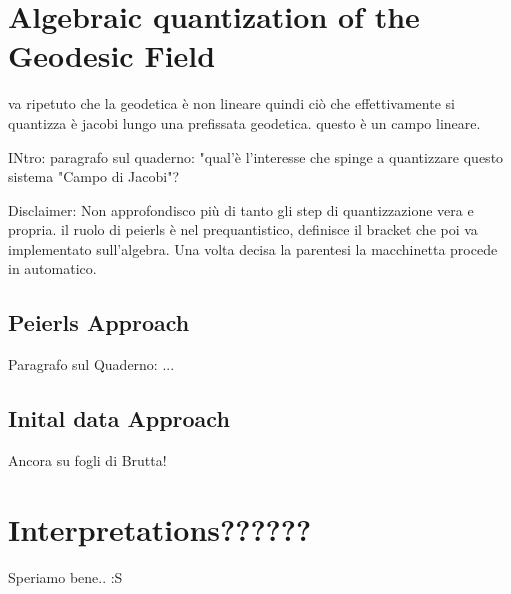 \documentclass[Main]{subfiles}
\begin{document}
\section{Algebraic quantization of the Geodesic Field}
	\begin{Warning}
	va ripetuto che la geodetica è non lineare quindi ciò che effettivamente si quantizza è jacobi lungo una prefissata geodetica. questo è un campo lineare.
	\end{Warning}
	
	\begin{Warning}
	INtro: paragrafo sul quaderno: "qual'è l'interesse che spinge a quantizzare questo sistema "Campo di Jacobi"?
	\end{Warning}

	\begin{Warning}
		Disclaimer: Non approfondisco più di tanto gli step di quantizzazione vera e propria. il ruolo di peierls è nel prequantistico, definisce il bracket che poi va implementato sull'algebra. Una volta decisa la parentesi la macchinetta procede in automatico.
	\end{Warning}

\subsection{Peierls Approach}
		\begin{Warning}
		Paragrafo sul Quaderno: ...
	\end{Warning}

\subsection{Inital data Approach}
	\begin{Warning}
		Ancora su fogli di Brutta!
	\end{Warning}

\section{Interpretations??????}
	\begin{Warning}
		Speriamo bene.. :S
	\end{Warning}
\end{document}
